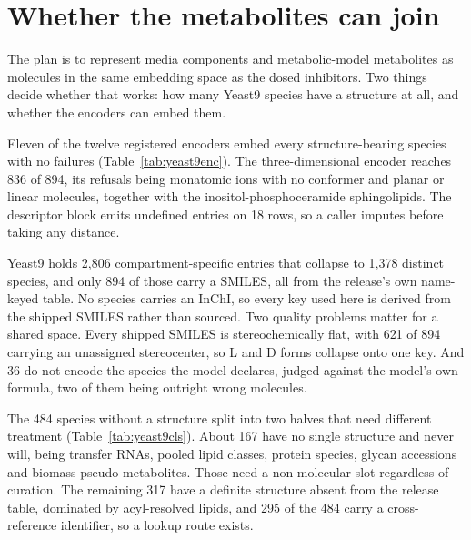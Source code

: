 
\section{Whether the metabolites can join}
\label{sec:metabolites}

The plan is to represent media components and metabolic-model metabolites as molecules in the
same embedding space as the dosed inhibitors. Two things decide whether that works: how many
Yeast9 species have a structure at all, and whether the encoders can embed them.

Eleven of the twelve registered encoders embed every structure-bearing species with no
failures (Table~\ref{tab:yeast9enc}). The three-dimensional encoder reaches 836 of 894, its
refusals being monatomic ions with no conformer and planar or linear molecules, together with
the inositol-phosphoceramide sphingolipids. The descriptor block emits undefined entries on 18
rows, so a caller imputes before taking any distance.

\begin{table}[htbp]
\centering
\footnotesize
\caption{Encoder coverage over the 894 structure-bearing Yeast9 species.}
\label{tab:yeast9enc}

\end{table}

Yeast9 holds 2{,}806 compartment-specific entries that collapse to 1{,}378 distinct species,
and only 894 of those carry a SMILES, all from the release's own name-keyed table. No species
carries an InChI, so every key used here is derived from the shipped SMILES rather than
sourced. Two quality problems matter for a shared space. Every shipped SMILES is
stereochemically flat, with 621 of 894 carrying an unassigned stereocenter, so L and D forms
collapse onto one key. And 36 do not encode the species the model declares, judged against the
model's own formula, two of them being outright wrong molecules.

The 484 species without a structure split into two halves that need different treatment
(Table~\ref{tab:yeast9cls}). About 167 have no single structure and never will, being transfer
RNAs, pooled lipid classes, protein species, glycan accessions and biomass pseudo-metabolites.
Those need a non-molecular slot regardless of curation. The remaining 317 have a definite
structure absent from the release table, dominated by acyl-resolved lipids, and 295 of the 484
carry a cross-reference identifier, so a lookup route exists.

